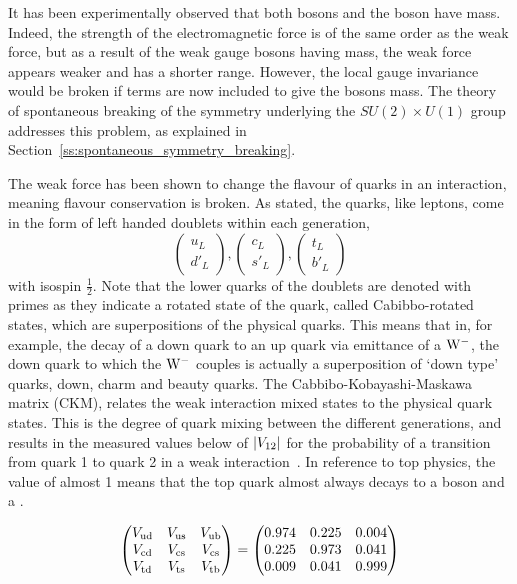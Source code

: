 It has been experimentally observed that both \W bosons and the \Z boson have mass. Indeed, the
strength of the electromagnetic force is of the same order as the weak force, but as a result of the weak
gauge bosons having mass, the weak force appears weaker and has a shorter range. However, the local gauge
invariance would be broken if terms are now included to give the bosons mass. The theory of spontaneous
breaking of the symmetry underlying the $SU(2) \times U(1)$ group addresses this problem, as explained in
Section~\ref{ss:spontaneous_symmetry_breaking}.

The weak force has been shown to change the flavour of quarks in an interaction, meaning flavour conservation
is broken. As stated, the quarks, like leptons, come in the form of left handed doublets within each
generation,
\begin{equation}
\left(\begin{array}{c} u_{L} \\ d'_{L} \end{array}\right) , \left(\begin{array}{c} c_{L} \\ 
s'_{L} \end{array}\right) , \left(\begin{array}{c} t_{L} \\ b'_{L} \end{array}\right)
\end{equation}
with isospin $\frac{1}{2}$. Note that the lower quarks of the doublets are denoted with primes as they
indicate a rotated state of the quark, called Cabibbo-rotated states, which are superpositions of the physical quarks.
This means that in, for example, the decay of a down quark to an up quark via emittance of a $\mathrm{W}^{-}$, the
down quark to which the $\mathrm{W}^{-}$ couples is actually a superposition of `down type' quarks, \ie down, charm
and beauty quarks. The Cabbibo-Kobayashi-Maskawa matrix (CKM), relates the weak interaction mixed states to the
physical quark states. This is the degree of quark mixing between the different generations, and results in
the measured values below of $\lvert V_{12} \rvert$ for the probability of a transition from quark 1 to quark
2 in a weak interaction~\cite{Agashe:2014kda}. In reference to top physics, the  value of almost 1
means that the top quark almost always decays to a \W boson and a \bquark.

\begin{equation}
\begin{pmatrix}
V_{\mathrm{u}\mathrm{d}} & V_{\mathrm{u}\mathrm{s}} & V_{\mathrm{u}\mathrm{b}} \\
V_{\mathrm{c}\mathrm{d}} & V_{\mathrm{c}\mathrm{s}} & V_{\mathrm{c}\mathrm{s}} \\
V_{\mathrm{t}\mathrm{d}} & V_{\mathrm{t}\mathrm{s}} & V_{\mathrm{t}\mathrm{b}} 
\end{pmatrix}
=
\begin{pmatrix}
0.974 & 0.225 & 0.004 \\
0.225 & 0.973 & 0.041 \\
0.009 & 0.041 & 0.999
\end{pmatrix}
\end{equation}


